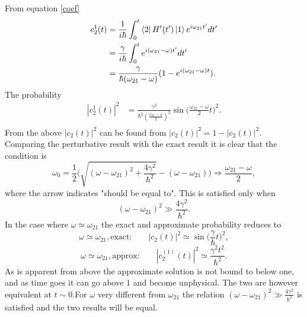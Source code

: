\begin{example}
\begin{enumerate}
		From equation \eqref{coef}
		\begin{equation}
			\begin{split}
				c^1_{2}(t)&=\frac{1}{i\hbar}\int_{0}^{t}\bra{2}H'(t')\ket{1}e^{i\omega_{21}t'}dt'\\
				&=\frac{\gamma}{i\hbar}\int_{0}^{t} e^{i(\omega_{21}-\omega )t'}dt'\\
				&=\frac{\gamma}{\hbar (\omega_{21}-\omega )}(1-e^{i(\omega_{21}-\omega )t}).\\
			\end{split}
		\end{equation} 
		The probability
		\begin{equation}
			\begin{split}
				|c^1_{2}(t)|^2&=\frac{\gamma^2}{\hbar^2 (\frac{\omega_{21}-\omega }{2})^2}\sin\bigg(\frac{\omega_{21}-\omega}{2}t\bigg)^2.\\
			\end{split}
		\end{equation} 
		From the above $|c_2(t)|^2$ can be found from $|c_2(t)|^2=1-|c_2(t)|^2$. Comparing the perturbative result with the exact result it is clear that the condition is
		\begin{equation}
			\omega_0=\frac{1}{2}\bigg(\sqrt{(\omega-\omega_{21})^2+\frac{4\gamma^2}{\hbar^2}}-(\omega-\omega_{21})\bigg) \Rightarrow \frac{\omega_{21}-\omega}{2},
		\end{equation} 
		where the arrow indicates "should be equal to". This is satisfied only when
		\begin{equation}
			(\omega-\omega_{21})^2\gg\frac{4\gamma^2}{\hbar^2}.
		\end{equation} 
		In the case where $\omega\simeq\omega_{21}$ the exact and approximate probability reduces to
		\begin{equation}
			\omega\simeq\omega_{21}, \mbox{exact:} \qquad |c_2(t)|^2\simeq \sin\bigg(\frac{\gamma}{\hbar}t\bigg)^2,
		\end{equation} 
		\begin{equation}
			\omega\simeq\omega_{21}, \mbox{approx:} \qquad |c^{(1)}_2(t)|^2\simeq \frac{\gamma^2t^2}{\hbar^2}.
		\end{equation} 
		As is apparent from above the approximate solution is not bound to below one, and as time goes it can go above 1 and become unphysical. The two are however equivalent at $t\sim 0$.\newline For $\omega$ very different from $\omega_{21}$ the relation $(\omega-\omega_{21})^2\gg\frac{4\gamma^2}{\hbar^2}$ is satisfied and the two results will be equal.
		
	\end{enumerate}
\end{example}

